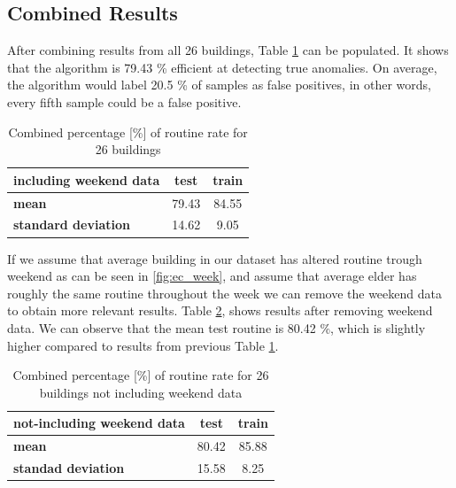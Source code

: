 \subsection{Combined Results}

After combining results from all 26 buildings, Table \ref{tab:ec_res_weekend} can be populated.
It shows that the algorithm is 79.43 \% efficient at detecting true anomalies. 
On average, the algorithm would label 20.5 \% of samples as false positives, 
in other words, every fifth sample could be a false positive. 

\begin{table}[htbp]
    \centering
    \caption{Combined percentage [\%] of routine rate for 26 buildings}
    \label{tab:ec_res_weekend}
    \begin{tabular}{lcc}
        \hline
        \textbf{including weekend data} & \textbf{test} & \textbf{train} \\
        \hline
        \textbf{mean} & 79.43 & 84.55 \\
        \textbf{standard deviation} & 14.62 & 9.05 \\
        \hline
        \end{tabular}
\end{table}

If we assume that average building in our dataset has altered routine trough weekend as can be seen in \ref{fig:ec_week},
and assume that average elder has roughly the same routine throughout the week we can remove the weekend data 
to obtain more relevant results.
Table \ref{tab:ec_res_no_weekend}, shows results after removing weekend data.
We can observe that the mean test routine is 80.42 \%, which is slightly higher compared to results from previous Table \ref{tab:ec_res_weekend}.

\begin{table}[htbp]
    \centering
    \caption{Combined percentage [\%] of routine rate for 26 buildings not including weekend data}
    \label{tab:ec_res_no_weekend}
    \begin{tabular}{lcc}
        \hline
        \textbf{not-including weekend data} & \textbf{test} & \textbf{train} \\
        \hline
        \textbf{mean} & 80.42 & 85.88 \\
        \textbf{standad deviation} & 15.58 & 8.25 \\
        \hline
        \end{tabular}
\end{table}

